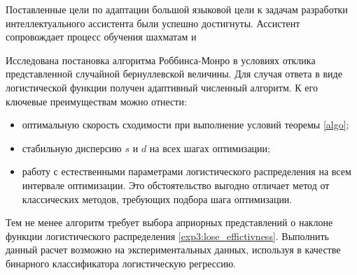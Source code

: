 Поставленные цели по адаптации большой языковой цели к задачам разработки интеллектуального ассистента были успешно достигнуты.
Ассистент сопровождает процесс обучения шахматам и  

Исследована постановка алгоритма Роббинса-Монро в условиях отклика представленной случайной бернуллевской величины. 
Для случая ответа в виде логистической функции получен адаптивный численный алгоритм. К его ключевые преимуществам можно отнести:
\begin{itemize}
    \item оптимальную скорость сходимости при выполнение условий теоремы \ref{algo};
    \item стабильную дисперсию $s$ и $d$ на всех шагах оптимизации;
    \item работу с естественными параметрами логистического распределения на всем интервале оптимизации.
    Это обстоятельство выгодно отличает метод от классических методов, требующих подбора шага оптимизации.
\end{itemize}
Тем не менее алгоритм требует выбора априорных представлений о наклоне функции логистического распределения \ref{exp3:lose_effictivness}. 
Выполнить данный расчет возможно на экспериментальных данных, используя в качестве бинарного классификатора логистическую регрессию.
